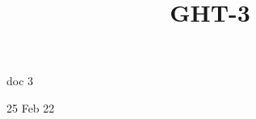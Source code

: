 \documentclass{article}
\begin{document}
\title{GHT-3}

\maketitle


doc 3


25 Feb 22
\end{document}

